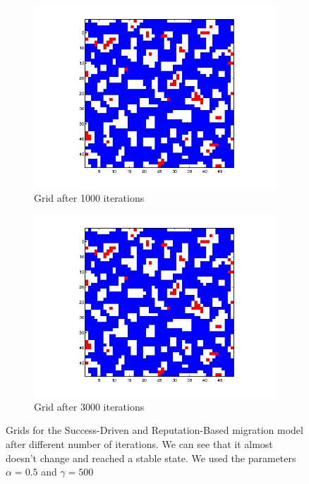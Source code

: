 \documentclass[11pt]{article}
\begin{document}
\begin{figure}
	\centering
	\begin{subfigure}[t]{0.4\textwidth}
        \includegraphics[width=\textwidth]{../../other/grids/m6-t1000.jpg}
	\caption{Grid after 1000 iterations}
    	\end{subfigure}
	\begin{subfigure}[t]{0.4\textwidth}
        \includegraphics[width=\textwidth]{../../other/grids/m6-t3000.jpg}
	\caption{Grid after 3000 iterations}
    	\end{subfigure}

	\caption{Grids for the Success-Driven and Reputation-Based migration model after different number of iterations. We can see that it almost doesn't change and reached a stable state. We used the parameters $\alpha = 0.5$ and $\gamma = 500$}
	\label{fig:grids_stable}
\end{figure}
\end{document}
